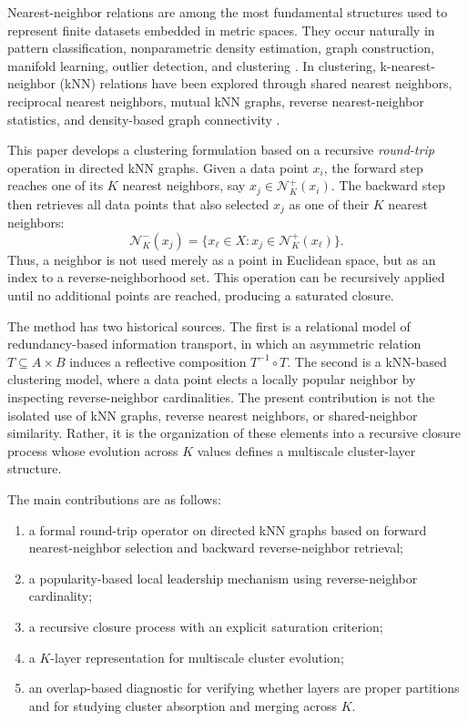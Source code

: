 \documentclass[pdflatex,sn-mathphys-num]{sn-jnl}
\theoremstyle{thmstyleone}
\theoremstyle{thmstyletwo}
\theoremstyle{thmstylethree}
\newcommand{\calN}{\mathcal{N}}
\begin{document}
Nearest-neighbor relations are among the most fundamental structures used to represent finite datasets embedded in metric spaces. They occur naturally in pattern classification, nonparametric density estimation, graph construction, manifold learning, outlier detection, and clustering \citep{CoverHart1967,LoftsgaardenQuesenberry1965,Bentley1975,FriedmanBentleyFinkel1977,VonLuxburg2007}. In clustering, k-nearest-neighbor (kNN) relations have been explored through shared nearest neighbors, reciprocal nearest neighbors, mutual kNN graphs, reverse nearest-neighbor statistics, and density-based graph connectivity \citep{JarvisPatrick1973,ErtozSteinbachKumar2003,BritoChavezQuirozYukich1997,GowdaKrishna1978,ChowdhuryAmorim2018,XieLeeWangChenZhou2019}.

This paper develops a clustering formulation based on a recursive \emph{round-trip} operation in directed kNN graphs. Given a data point $x_i$, the forward step reaches one of its $K$ nearest neighbors, say $x_j\in\calN_K^+(x_i)$. The backward step then retrieves all data points that also selected $x_j$ as one of their $K$ nearest neighbors:
\begin{equation}
\calN_K^-(x_j)=\{x_\ell\in X: x_j\in\calN_K^+(x_\ell)\}.
\end{equation}
Thus, a neighbor is not used merely as a point in Euclidean space, but as an index to a reverse-neighborhood set. This operation can be recursively applied until no additional points are reached, producing a saturated closure.

The method has two historical sources. The first is a relational model of redundancy-based information transport, in which an asymmetric relation $T\subseteq A\times B$ induces a reflective composition $T^{-1}\circ T$. The second is a kNN-based clustering model, where a data point elects a locally popular neighbor by inspecting reverse-neighbor cardinalities. The present contribution is not the isolated use of kNN graphs, reverse nearest neighbors, or shared-neighbor similarity. Rather, it is the organization of these elements into a recursive closure process whose evolution across $K$ values defines a multiscale cluster-layer structure.

The main contributions are as follows:
\begin{enumerate}
    \item a formal round-trip operator on directed kNN graphs based on forward nearest-neighbor selection and backward reverse-neighbor retrieval;
    \item a popularity-based local leadership mechanism using reverse-neighbor cardinality;
    \item a recursive closure process with an explicit saturation criterion;
    \item a $K$-layer representation for multiscale cluster evolution;
    \item an overlap-based diagnostic for verifying whether layers are proper partitions and for studying cluster absorption and merging across $K$.
\end{enumerate}
\end{document}
